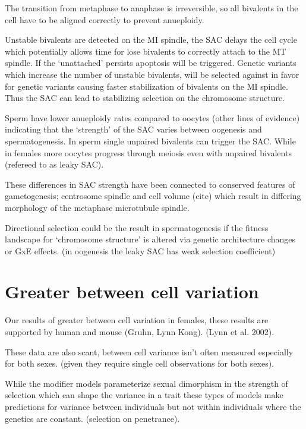 \documentclass[]{article}
\begin{document}
The transition from metaphase to anaphase is irreversible, so all
bivalents in the cell have to be aligned correctly to prevent
anueploidy.

Unstable bivalents are detected on the MI spindle, the SAC delays the
cell cycle which potentially allows time for lose bivalents to correctly
attach to the MT spindle. If the `unattached' persists apoptosis will be
triggered. Genetic variants which increase the number of unstable
bivalents, will be selected against in favor for genetic variants
causing faster stabilization of bivalents on the MI spindle. Thus the
SAC can lead to stabilizing selection on the chromosome structure.

Sperm have lower anueploidy rates compared to oocytes (other lines of
evidence) indicating that the `strength' of the SAC varies between
oogenesis and spermatogenesis. In sperm single unpaired bivalents can
trigger the SAC. While in females more oocytes progress through meiosis
even with unpaired bivalents (refereed to as leaky SAC).

These differences in SAC strength have been connected to conserved
features of gametogenesis; centrosome spindle and cell volume (cite)
which result in differing morphology of the metaphase microtubule
spindle.

Directional selection could be the result in spermatogenesis if the
fitness landscape for `chromosome structure' is altered via genetic
architecture changes or GxE effects. (in oogenesis the leaky SAC has
weak selection coefficient)

\section{Greater between cell
variation}\label{greater-between-cell-variation}

Our results of greater between cell variation in females, these results
are supported by human and mouse (Gruhn, Lynn Kong). (Lynn et al. 2002).

These data are also scant, between cell variance isn't often measured
especially for both sexes. (given they require single cell observations
for both sexes).

While the modifier models parameterize sexual dimorphism in the strength
of selection which can shape the variance in a trait these types of
models make predictions for variance between individuals but not within
individuals where the genetics are constant. (selection on penetrance).
\end{document}
